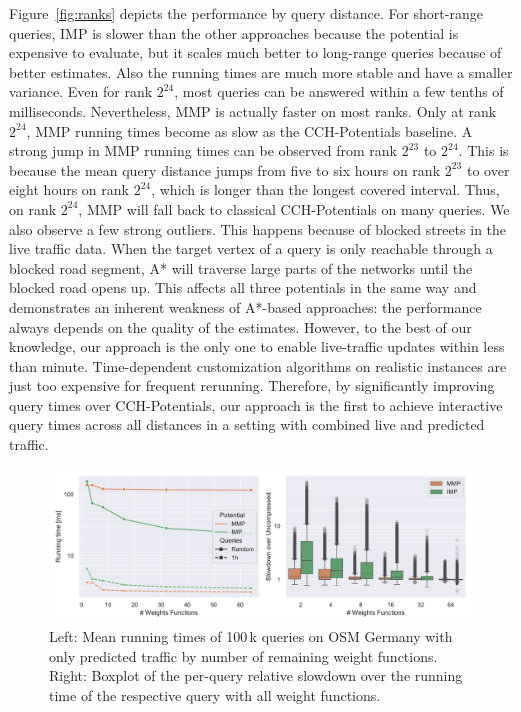 \documentclass[a4paper,UKenglish,cleveref, autoref, thm-restate,anonymous]{lipics-v2021}
\begin{document}
Figure~\ref{fig:ranks} depicts the performance by query distance.
For short-range queries, IMP is slower than the other approaches because the potential is expensive to evaluate, but it scales much better to long-range queries because of better estimates.
Also the running times are much more stable and have a smaller variance.
Even for rank $2^24$, most queries can be answered within a few tenths of milliseconds.
Nevertheless, MMP is actually faster on most ranks.
Only at rank $2^24$, MMP running times become as slow as the CCH-Potentials baseline.
A strong jump in MMP running times can be observed from rank $2^23$ to $2^24$.
This is because the mean query distance jumps from five to six hours on rank $2^23$ to over eight hours on rank $2^24$, which is longer than the longest covered interval.
Thus, on rank $2^24$, MMP will fall back to classical CCH-Potentials on many queries.
We also observe a few strong outliers.
This happens because of blocked streets in the live traffic data.
When the target vertex of a query is only reachable through a blocked road segment, A* will traverse large parts of the networks until the blocked road opens up.
This affects all three potentials in the same way and demonstrates an inherent weakness of A*-based approaches: the performance always depends on the quality of the estimates.
However, to the best of our knowledge, our approach is the only one to enable live-traffic updates within less than minute.
Time-dependent customization algorithms on realistic instances are just too expensive for frequent rerunning.
Therefore, by significantly improving query times over CCH-Potentials, our approach is the first to achieve interactive query times across all distances in a setting with combined live and predicted traffic. %

\begin{figure}[!t]
\centering
\includegraphics[width=\linewidth]{fig/compression.pdf}
\caption{
Left: Mean running times of 100\,k queries on OSM Germany with only predicted traffic by number of remaining weight functions.
Right: Boxplot of the per-query relative slowdown over the running time of the respective query with all weight functions.
}\label{fig:compression}
\end{figure}
\end{document}
